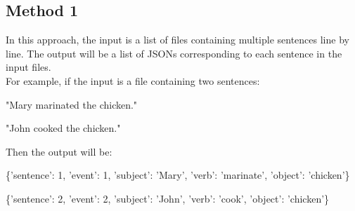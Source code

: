 \documentclass[11pt,letterpaper]{article}
\begin{document}
\subsection{Method 1}
In this approach, the input is a list of files containing multiple sentences line by line. The output will be a list of JSONs corresponding to each sentence in the input files. \\
\noindent
For example, if the input is a file containing two sentences:

"Mary marinated the chicken." 

"John cooked the chicken."

\noindent \newline
Then the output will be:

\{'sentence': 1, 'event': 1, 'subject': 'Mary', 'verb': 'marinate', 'object': 'chicken'\}

\{'sentence': 2, 'event': 2, 'subject': 'John', 'verb': 'cook', 'object': 'chicken'\}
\end{document}
